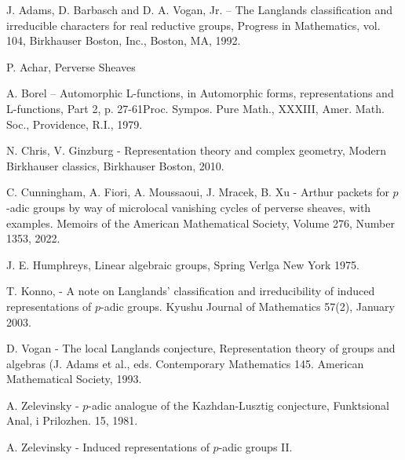 \documentclass{memoir}
\theoremstyle{definition}
\begin{document}
	
		\begin{thebibliography}{2}
		
		 J. Adams, D. Barbasch and D. A. Vogan, Jr. – The Langlands classification
		and irreducible characters for real reductive groups, Progress in Mathematics, vol. 104,
		Birkhauser Boston, Inc., Boston, MA, 1992.
		
		 P. Achar, Perverse Sheaves
		
		 A. Borel – Automorphic L-functions, in Automorphic forms, representations and
		L-functions, Part
		2, p. 27-61Proc. Sympos. Pure Math., XXXIII, Amer. Math. Soc., Providence, R.I., 1979. 
		
		 N. Chris, V. Ginzburg
		-
		Representation theory and complex geometry, Modern Birkhauser classics, Birkhauser Boston, 2010.
		
		 C. Cunningham, A. Fiori, A. Moussaoui, J. Mracek,  B. Xu - Arthur packets for $p$-adic groups by way of microlocal vanishing cycles of perverse sheaves, with examples. Memoirs of the American Mathematical Society, Volume 276, Number 1353, 2022.
		
		 J. E. Humphreys, Linear algebraic groups, Spring Verlga New York 1975.
		
		 T. Konno, - A note on Langlands’ classification and irreducibility of induced representations of $p$-adic groups. Kyushu Journal of Mathematics 57(2), January 2003. 
		
		 D. Vogan - The local Langlands conjecture, Representation theory of groups and algebras (J. Adams et al., eds. Contemporary Mathematics 145. American Mathematical Society, 1993.
		
		 A. Zelevinsky - $p$-adic analogue of the Kazhdan-Lusztig conjecture, Funktsional Anal, i Prilozhen.
		15, 1981.
		
		 A. Zelevinsky - Induced representations of $p$-adic groups II.  
	\end{thebibliography}
	
\end{document}
